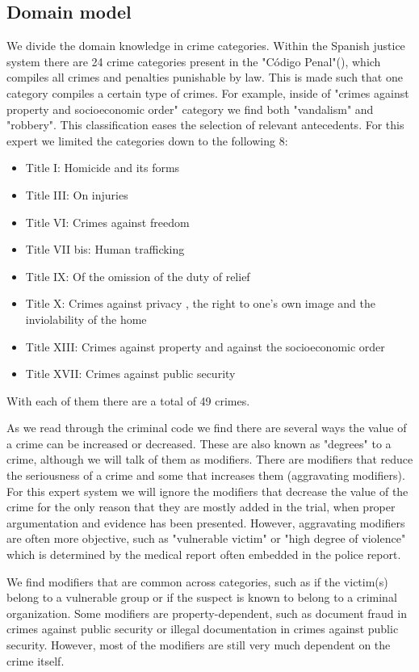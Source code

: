 \documentclass{article}
\begin{document}
\subsection{Domain model}
We divide the domain knowledge in crime categories. Within the Spanish justice system there are 24 crime categories present in the "Código Penal"(\cite{CdigoPenal}), which compiles all crimes and penalties punishable by law. This is made such that one category compiles a certain type of crimes. For example, inside of "crimes against property and socioeconomic order" category we find both "vandalism" and "robbery". This classification eases the selection of relevant antecedents.
For this expert we limited the categories down to the following 8:
\begin{itemize}
    \item Title I: Homicide and its forms
    \item Title III: On injuries
    \item Title VI: Crimes against freedom
    \item Title VII bis: Human trafficking
    \item Title IX: Of the omission of the duty of relief
    \item Title X: Crimes against privacy , the right to one's own image and the inviolability of the home
    \item Title XIII: Crimes against property and against the socioeconomic order
    \item Title XVII: Crimes against public security
\end{itemize}
With each of them there are a total of 49 crimes.

As we read through the criminal code we find there are several ways the value of a crime can be increased or decreased. These are also known as "degrees" to a crime, although we will talk of them as modifiers. There are modifiers that reduce the seriousness of a crime and some that increases them (aggravating modifiers). For this expert system we will ignore the modifiers that decrease the value of the crime for the only reason that they are mostly added in the trial, when proper argumentation and evidence has been presented. However, aggravating modifiers are often more objective, such as "vulnerable victim" or "high degree of violence" which is determined by the medical report often embedded in the police report. 

We find modifiers that are common across categories, such as if the victim(s) belong to a vulnerable group or if the suspect is known to belong to a criminal organization. Some modifiers are property-dependent, such as document fraud in crimes against public security or illegal documentation in crimes against public security. However, most of the modifiers are still very much dependent on the crime itself. \\
\end{document}
